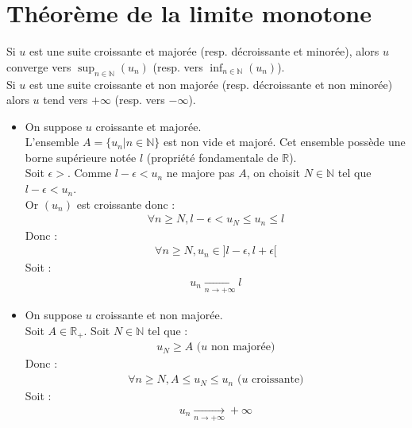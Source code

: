 \documentclass[../main.tex]{subfiles}
\begin{document}
\section{Théorème de la limite monotone}
\begin{tcolorbox}[title=Théorème 14.50, title filled=false, colframe=orange, colback=orange!10!white]
    Si $u$ est une suite croissante et majorée (resp. décroissante et minorée), alors $u$ converge vers $\sup_{n\in \mathbb{N}}(u_n)$ (resp. vers $\inf_{n\in \mathbb{N}}(u_n)$). \\
    Si $u$ est une suite croissante et non majorée (resp. décroissante et non minorée) alors $u$ tend vers $+\infty$ (resp. vers $-\infty$). 
\end{tcolorbox}

\begin{itemize}
    \item On suppose $u$ croissante et majorée. \\
    L'ensemble $A = \{ u_n | n\in \mathbb{N} \}$ est non vide et majoré. Cet ensemble possède une borne supérieure notée $l$ (propriété fondamentale de $\mathbb{R}$). \\
    Soit $\epsilon > $. Comme $l - \epsilon < u_n$ ne majore pas $A$, on choisit $N \in \mathbb{N}$ tel que $l - \epsilon < u_n$. \\
    Or $(u_n)$ est croissante donc : 
    \begin{align*}
        \forall n \geq N, l - \epsilon < u_N \leq u_n \leq l
    \end{align*}
    Donc : 
    \begin{align*}
        \forall n \geq N, u_n \in ]l-\epsilon, l+\epsilon[
    \end{align*}
    Soit : 
    \begin{align*}
        \boxed{u_n \underset{n \to +\infty}{\longrightarrow} l}
    \end{align*}

    \item On suppose $u$ croissante et non majorée. \\
    Soit $A \in \mathbb{R}_+$. Soit $N \in \mathbb{N}$ tel que : 
    \begin{align*}
        u_N \geq A \text{ ($u$ non majorée)}
    \end{align*}
    Donc : 
    \begin{align*}
        \forall n \geq N, A \leq u_N \leq u_n \text{ ($u$ croissante)}
    \end{align*}
    Soit : 
    \begin{align*}
        \boxed{u_n \underset{n \to +\infty}{\longrightarrow} +\infty}
    \end{align*}
\end{itemize}
\end{document}
